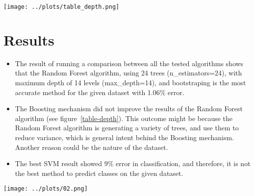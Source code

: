 \documentclass[10pt,twocolumn]{article}
\begin{document}
\begin{figure*}[!t]
  \begin{center}
    \texttt{[image: ../plots/table\_depth.png]}
  \end{center}
  \caption{\small A comparison between error rates of different classification methods with a changing maximum depth. It is clear that Random Forest methods improve with depth, while regular decisiton trees do not.\\Boosting improved the regular Decision Tree results.}
  \label{table-depth}
\end{figure*}

\section{Results}
\begin{itemize}
  \item The result of running a comparison between all the tested algorithms shows that the Random Forest algorithm, using 24 trees (n\_estimators=24), with maximum depth of 14 levels (max\_depth=14), and bootstraping is the most accurate method for the given dataset with 1.06\% error.
  \item The Boosting mechanism did not improve the results of the Random Forest algorithm (see figure~\ref{table-depth}). This outcome might be because the Random Forest algorithm is generating a variety of trees, and use them to reduce variance, which is general intent behind the Boosting mechanism. Another reason could be the nature of the dataset.
  \item The best SVM result showed 9\% error in classification, and therefore, it is not the best method to predict classes on the given dataset.
\end{itemize}



\begin{figure*}[!b]
  \begin{center}
    \texttt{[image: ../plots/02.png]}
  \end{center}
  \caption{\small The classification results from all tested algorithms. The graphs show the best consistent result from each algorithm.}
  \label{classes}
\end{figure*}
\end{document}
